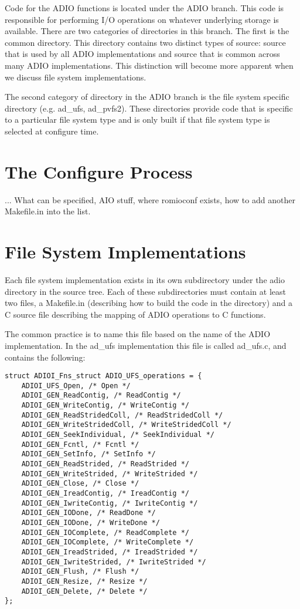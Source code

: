 Code for the ADIO functions is located under the ADIO branch.  This code is
responsible for performing I/O operations on whatever underlying storage is
available.  There are two categories of directories in this branch.  The first
is the common directory.  This directory contains two distinct types of
source: source that is used by all ADIO implementations and source that is
common across many ADIO implementations.  This distinction will become more
apparent when we discuss file system implementations.

The second category of directory in the ADIO branch is the file system
specific directory (e.g. ad\_ufs, ad\_pvfs2).  These directories provide code
that is specific to a particular file system type and is only built if that
file system type is selected at configure time.

\section{The Configure Process}

... What can be specified, AIO stuff, where romioconf exists, how to add
another Makefile.in into the list.

\section{File System Implementations}

Each file system implementation exists in its own subdirectory under the adio
directory in the source tree.  Each of these subdirectories must contain at
least two files, a Makefile.in (describing how to build the code in the
directory) and a C source file describing the mapping of ADIO operations to C
functions.

The common practice is to name this file based on the name of the ADIO
implementation.  In the ad\_ufs implementation this file is called ad\_ufs.c,
and contains the following:

\begin{verbatim}
struct ADIOI_Fns_struct ADIO_UFS_operations = {
	ADIOI_UFS_Open, /* Open */
	ADIOI_GEN_ReadContig, /* ReadContig */
	ADIOI_GEN_WriteContig, /* WriteContig */
	ADIOI_GEN_ReadStridedColl, /* ReadStridedColl */
	ADIOI_GEN_WriteStridedColl, /* WriteStridedColl */
	ADIOI_GEN_SeekIndividual, /* SeekIndividual */
	ADIOI_GEN_Fcntl, /* Fcntl */
	ADIOI_GEN_SetInfo, /* SetInfo */
	ADIOI_GEN_ReadStrided, /* ReadStrided */
	ADIOI_GEN_WriteStrided, /* WriteStrided */
	ADIOI_GEN_Close, /* Close */
	ADIOI_GEN_IreadContig, /* IreadContig */
	ADIOI_GEN_IwriteContig, /* IwriteContig */
	ADIOI_GEN_IODone, /* ReadDone */
	ADIOI_GEN_IODone, /* WriteDone */
	ADIOI_GEN_IOComplete, /* ReadComplete */
	ADIOI_GEN_IOComplete, /* WriteComplete */
	ADIOI_GEN_IreadStrided, /* IreadStrided */
	ADIOI_GEN_IwriteStrided, /* IwriteStrided */
	ADIOI_GEN_Flush, /* Flush */
	ADIOI_GEN_Resize, /* Resize */
	ADIOI_GEN_Delete, /* Delete */
};
\end{verbatim}

